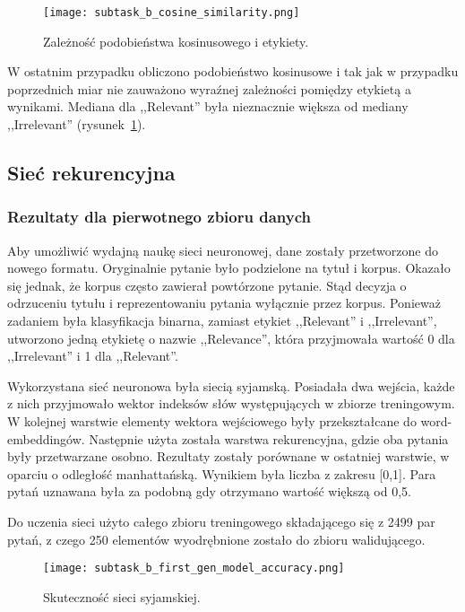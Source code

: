 \begin{figure}[H]
\caption{Zależność podobieństwa kosinusowego i etykiety. \label{fig:cosinusb}}
\centering
\texttt{[image: subtask\_b\_cosine\_similarity.png]}
\end{figure}

W ostatnim przypadku obliczono podobieństwo kosinusowe i tak jak w przypadku poprzednich miar nie zauważono wyraźnej zależności pomiędzy etykietą a wynikami. Mediana dla ,,Relevant'' była nieznacznie większa od mediany ,,Irrelevant'' (rysunek~\ref{fig:cosinusb}).


\subsection{Sieć rekurencyjna}
\subsubsection{Rezultaty dla pierwotnego zbioru danych}

Aby umożliwić wydajną naukę sieci neuronowej, dane zostały przetworzone do nowego formatu. Oryginalnie pytanie było podzielone na tytuł i korpus. Okazało się jednak, że korpus często zawierał powtórzone pytanie. Stąd decyzja o odrzuceniu tytułu i reprezentowaniu pytania wyłącznie przez korpus. Ponieważ zadaniem była klasyfikacja binarna, zamiast etykiet ,,Relevant'' i ,,Irrelevant'', utworzono jedną etykietę o nazwie ,,Relevance'', która przyjmowała wartość 0 dla ,,Irrelevant'' i 1 dla ,,Relevant''.

Wykorzystana sieć neuronowa była siecią syjamską. Posiadała dwa wejścia, każde z nich przyjmowało wektor indeksów słów występujących w zbiorze treningowym. W kolejnej warstwie elementy wektora wejściowego były przekształcane do word-embeddingów. Następnie użyta została warstwa rekurencyjna, gdzie oba pytania były przetwarzane osobno. Rezultaty zostały porównane w ostatniej warstwie, w oparciu o odległość manhattańską. Wynikiem była liczba z zakresu [0,1]. Para pytań uznawana była za podobną gdy otrzymano wartość większą od 0,5.

Do uczenia sieci użyto całego zbioru treningowego składającego się z 2499 par pytań, z czego 250 elementów wyodrębnione zostało do zbioru walidującego.

\begin{figure}[H]
\caption{Skuteczność sieci syjamskiej.\label{fig:suktecznoscbacc}}
\centering
\texttt{[image: subtask\_b\_first\_gen\_model\_accuracy.png]}
\end{figure}

